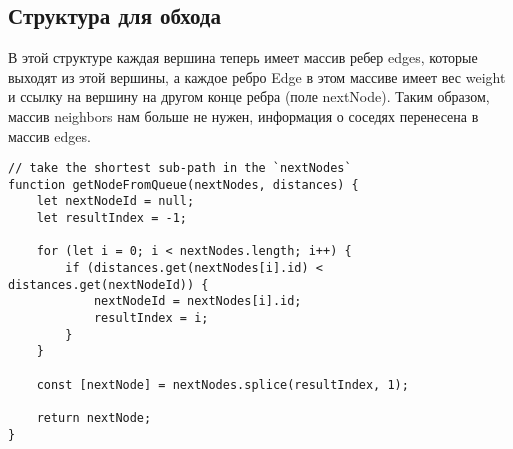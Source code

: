 \documentclass[../../article.tex]{subfiles}
\begin{document}
\subsection{Структура для обхода}

В этой структуре каждая вершина теперь имеет массив ребер {\firacodebold edges}, которые выходят из этой вершины, а каждое ребро {\firacodebold Edge} в этом массиве имеет вес {\firacodebold weight} и ссылку на вершину на другом конце ребра (поле {\firacodebold nextNode}). Таким образом, массив {\firacodebold neighbors} нам больше не нужен, информация о соседях перенесена в массив {\firacodebold edges}.

\begin{figure*}
    \begin{ruledelement}
        \begin{lstlisting}[caption={Извлечение следующей вершины для обхода в алгоритме Дейкстры}, label={lst:dijkstraDiffBfs}]
// take the shortest sub-path in the `nextNodes`
function getNodeFromQueue(nextNodes, distances) {
    let nextNodeId = null;
    let resultIndex = -1;

    for (let i = 0; i < nextNodes.length; i++) {
        if (distances.get(nextNodes[i].id) < distances.get(nextNodeId)) {
            nextNodeId = nextNodes[i].id;
            resultIndex = i;
        }
    }

    const [nextNode] = nextNodes.splice(resultIndex, 1);

    return nextNode;
}
        \end{lstlisting}
    \end{ruledelement}
\end{figure*}
\end{document}
